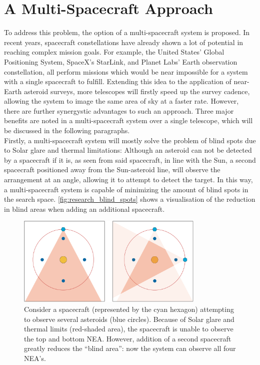 \section{A Multi-Spacecraft Approach}
\label{sec:researchmultispacecraft}
To address this problem, the option of a multi-spacecraft system is proposed. In recent years, spacecraft constellations have already shown a lot of potential in reaching complex mission goals. For example, the United States' Global Positioning System, SpaceX's StarLink, and Planet Labs' Earth observation constellation, all perform missions which would be near impossible for a system with a single spacecraft to fulfill. Extending this idea to the application of near-Earth asteroid surveys, more telescopes will firstly speed up the survey cadence, allowing the system to image the same area of sky at a faster rate. However, there are further synergystic advantages to such an approach. Three major benefits are noted in a multi-spacecraft system over a single telescope, which will be discussed in the following paragraphs.\\

Firstly, a multi-spacecraft system will mostly solve the problem of blind spots due to Solar glare and thermal limitations: Although an asteroid can not be detected by a spacecraft if it is, as seen from said spacecraft, in line with the Sun, a second spacecraft positioned away from the Sun-asteroid line, will observe the arrangement at an angle, allowing it to attempt to detect the target. In this way, a multi-spacecraft system is capable of minimizing the amount of blind spots in the search space. \autoref{fig:research_blind_spots} shows a visualisation of the reduction in blind areas when adding an additional spacecraft.\\

\begin{figure}[htbp]
 \centering
 \includegraphics[width=0.8\textwidth]{img/research_blind_spots.png}
 \caption{Consider a spacecraft (represented by the cyan hexagon) attempting to observe several asteroids (blue circles). Because of Solar glare and thermal limits (red-shaded area), the spacecraft is unable to observe the top and bottom NEA. However, addition of a second spacecraft greatly reduces the ``blind area'': now the system can observe all four NEA's.}
 \label{fig:research_blind_spots}
\end{figure}


